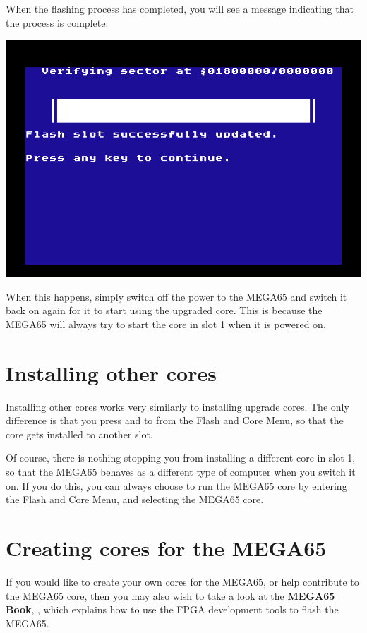 When the flashing process has completed, you will see a message indicating that the process is complete:

\begin{center}
\includegraphics[trim= 10mm  3mm 10mm 15mm,clip,width=0.7\linewidth]{images/ss-flashmenu-done.png}
\end{center}


When this happens, simply switch off the power to the MEGA65 and switch it back on again for it to start using the
upgraded core.  This is because the MEGA65 will always try to start the core in slot 1 when
it is powered on.

\section{Installing other cores}

Installing other cores works very similarly to installing upgrade cores. The only difference is that you
press  and  to  from the Flash and Core Menu, so that the core
gets installed to another slot.

Of course, there is nothing stopping you from installing a different core
in slot 1, so that the MEGA65 behaves as a different type of computer when you switch it on.  If you do this,
you can always choose to run the MEGA65 core by entering the Flash and Core Menu, and selecting the MEGA65
core.

\section{Creating cores for the MEGA65}

If you would like to create your own cores for the MEGA65, or help
contribute to the MEGA65 core, then
you may also wish to take a look at
\ifdefined\printmanual
the {\bf MEGA65 Book},
\else
{},
\fi
which explains how to use the
FPGA development tools to flash the MEGA65.

